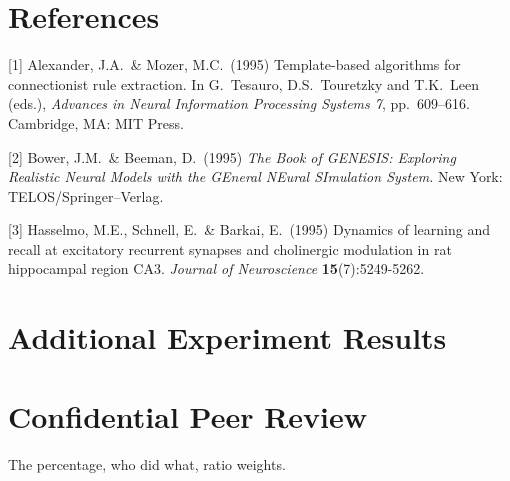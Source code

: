 \documentclass{article}
\begin{document}
\section*{References}

{
\small


[1] Alexander, J.A.\ \& Mozer, M.C.\ (1995) Template-based algorithms for
connectionist rule extraction. In G.\ Tesauro, D.S.\ Touretzky and T.K.\ Leen
(eds.), {\it Advances in Neural Information Processing Systems 7},
pp.\ 609--616. Cambridge, MA: MIT Press.


[2] Bower, J.M.\ \& Beeman, D.\ (1995) {\it The Book of GENESIS: Exploring
  Realistic Neural Models with the GEneral NEural SImulation System.}  New York:
TELOS/Springer--Verlag.


[3] Hasselmo, M.E., Schnell, E.\ \& Barkai, E.\ (1995) Dynamics of learning and
recall at excitatory recurrent synapses and cholinergic modulation in rat
hippocampal region CA3. {\it Journal of Neuroscience} {\bf 15}(7):5249-5262.
}
\section*{Additional Experiment Results}

\section*{Confidential Peer Review} 

The percentage, who did what, ratio weights. 
\end{document}
